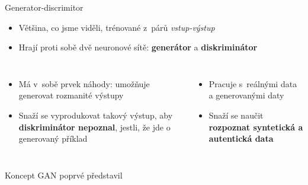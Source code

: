 \documentclass[aspectratio=169,dvipsnames]{beamer}
\begin{document}
\begin{frame}{Generator-discrimitor}

    \begin{itemize}[<+->]

        \item Většina, co jsme viděli, trénované z~párů \emph{vstup-výstup}

        \item Hrají proti sobě dvě neuronové sítě: {\bf generátor} a {\bf
            diskriminátor}

    \end{itemize}

    \vspace{10pt}

    \begin{columns}[t]

        \begin{itemize}

            \item<4-> Má v~sobě prvek náhody: umožňuje generovat rozmanité výstupy

            \item<5-> Snaží se vyprodukovat takový výstup, aby
                \textbf{diskriminátor nepoznal}, jestli, že jde o generovaný
                příklad

        \end{itemize}


        \begin{itemize}

            \item<6-> Pracuje s~reálnými data a generovanými daty

            \item<7-> Snaží se naučit \textbf{rozpoznat syntetická a autentická
                data}


        \end{itemize}

    \end{columns}

    \vspace{10pt}

    \tiny Koncept GAN poprvé představil \citet{goodfellow2014generative}

\end{frame}
\end{document}
